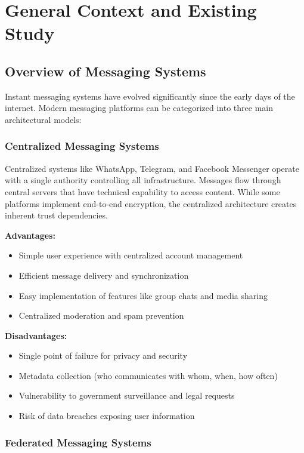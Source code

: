 \chapter{General Context and Existing Study}

\section{Overview of Messaging Systems}

Instant messaging systems have evolved significantly since the early days of the internet. Modern messaging platforms can be categorized into three main architectural models:

\subsection{Centralized Messaging Systems}

Centralized systems like WhatsApp, Telegram, and Facebook Messenger operate with a single authority controlling all infrastructure. Messages flow through central servers that have technical capability to access content. While some platforms implement end-to-end encryption, the centralized architecture creates inherent trust dependencies.

\textbf{Advantages:}
\begin{itemize}
    \item Simple user experience with centralized account management
    \item Efficient message delivery and synchronization
    \item Easy implementation of features like group chats and media sharing
    \item Centralized moderation and spam prevention
\end{itemize}

\textbf{Disadvantages:}
\begin{itemize}
    \item Single point of failure for privacy and security
    \item Metadata collection (who communicates with whom, when, how often)
    \item Vulnerability to government surveillance and legal requests
    \item Risk of data breaches exposing user information
\end{itemize}

\subsection{Federated Messaging Systems}

